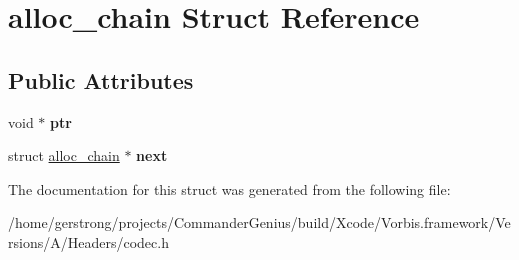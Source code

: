 \hypertarget{structalloc__chain}{
\section{alloc\_\-chain Struct Reference}
\label{structalloc__chain}
}
\subsection*{Public Attributes}
\begin{DoxyCompactItemize}
\item 
\hypertarget{structalloc__chain_a564538413768f266bd5bda09d892e99d}{
void $\ast$ {\bfseries ptr}}
\label{structalloc__chain_a564538413768f266bd5bda09d892e99d}

\item 
\hypertarget{structalloc__chain_a596f6605e59080015c3c6dfd07326c83}{
struct \hyperlink{structalloc__chain}{alloc\_\-chain} $\ast$ {\bfseries next}}
\label{structalloc__chain_a596f6605e59080015c3c6dfd07326c83}

\end{DoxyCompactItemize}


The documentation for this struct was generated from the following file:\begin{DoxyCompactItemize}
\item 
/home/gerstrong/projects/CommanderGenius/build/Xcode/Vorbis.framework/Versions/A/Headers/codec.h\end{DoxyCompactItemize}
